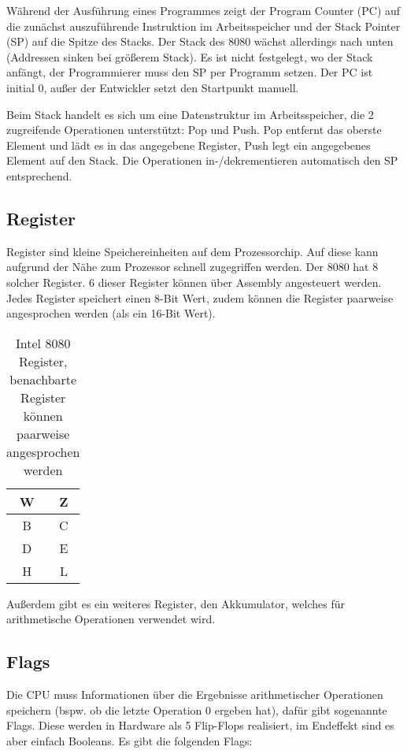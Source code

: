 Während der Ausführung eines Programmes zeigt der Program Counter (PC) auf die zunächst auszuführende Instruktion im Arbeitsspeicher und der Stack Pointer (SP) auf die Spitze des Stacks. Der Stack des 8080 wächst allerdings nach unten (Addressen sinken bei größerem Stack).
Es ist nicht festgelegt, wo der Stack anfängt, der Programmierer muss den SP per Programm setzen. Der PC ist initial 0, außer der Entwickler setzt den Startpunkt manuell.

Beim Stack handelt es sich um eine Datenstruktur im Arbeitsspeicher, die 2 zugreifende Operationen unterstützt: Pop und Push. Pop entfernt das oberste Element und lädt es in das angegebene Register, Push legt ein angegebenes Element auf den Stack. Die Operationen in-/dekrementieren automatisch den SP entsprechend.

\subsection{Register}

Register sind kleine Speichereinheiten auf dem Prozessorchip. Auf diese kann aufgrund der Nähe zum Prozessor schnell zugegriffen werden. Der 8080 hat 8 solcher Register.
6 dieser Register können über Assembly angesteuert werden. Jedes Register speichert einen 8-Bit Wert, zudem können die Register paarweise angesprochen werden (als ein 16-Bit Wert).

\begin{table}[h]
    \centering
    \caption{Intel 8080 Register, benachbarte Register können paarweise angesprochen werden}
    \label{tab:regs}
    \begin{tabular}{|c|c|}
        \hline
        W & Z \\\hline
        B & C \\\hline
        D & E \\\hline
        H & L \\\hline
    \end{tabular}
\end{table}

Außerdem gibt es ein weiteres Register, den Akkumulator, welches für arithmetische Operationen verwendet wird.


\subsection{Flags}

Die CPU muss Informationen über die Ergebnisse arithmetischer Operationen speichern (bspw. ob die letzte Operation 0 ergeben hat), dafür gibt sogenannte Flags. Diese werden in Hardware als 5 Flip-Flops realisiert, im Endeffekt sind es aber einfach Booleans. Es gibt die folgenden Flags:

